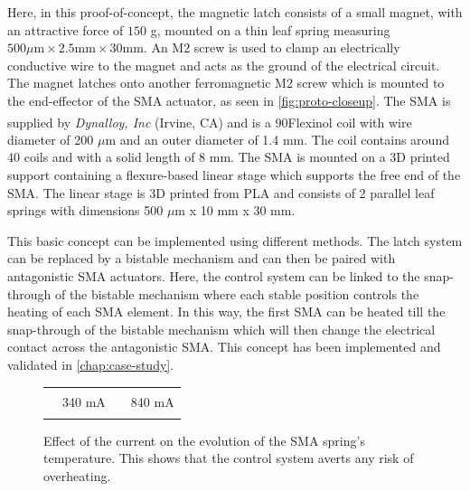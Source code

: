 Here, in this proof-of-concept, the magnetic latch consists of a small magnet, with an attractive force of $150$ g, mounted on a thin leaf spring measuring $500\mu\mathrm{m}\times2.5\mathrm{mm}\times30\mathrm{mm}$. An M2 screw is used to clamp an electrically conductive wire to the magnet and acts as the ground of the electrical circuit. The magnet latches onto another ferromagnetic M2 screw which is mounted to the end-effector of the SMA actuator, as seen in \cref{fig:proto-closeup}. The SMA is supplied by \textit{Dynalloy, Inc} (Irvine, CA) and is a 90\degreeC Flexinol\textsuperscript{\textregistered} coil with wire diameter of 200 $\mu$m and an outer diameter of 1.4 mm. The coil contains around 40 coils and with a solid length of 8 mm. The SMA is mounted on a 3D printed support containing a flexure-based linear stage which supports the free end of the SMA. The linear stage is 3D printed from PLA and consists of 2 parallel leaf springs with dimensions 500 $\mu$m x 10 mm x 30 mm.

This basic concept can be implemented using different methods. The latch system can be replaced by a bistable mechanism and can then be paired with antagonistic SMA actuators. Here, the control system can be linked to the snap-through of the bistable mechanism where each stable position controls the heating of each SMA element. In this way, the first SMA can be heated till the snap-through of the bistable mechanism which will then change the electrical contact across the antagonistic SMA. This concept has been implemented and validated in \cref{chap:case-study}.

\begin{figure}[htb!] %
  \centering
      \resizebox{0.75\textwidth}{!}{}
  \begin{tabular}{r@{ }l r@{ }l}
    {\color{myblue} \rule[2pt]{10pt}{0.5mm} } & 340 mA & {\color{myred} \rule[2pt]{10pt}{0.5mm} } & 840 mA
  \end{tabular}
  \caption[Effect of the current on the evolution of the SMA spring's temperature]{Effect of the current on the evolution of the SMA spring's temperature. This shows that the control system averts any risk of overheating.}
  \label{fig:thermal-osc}
\end{figure}


